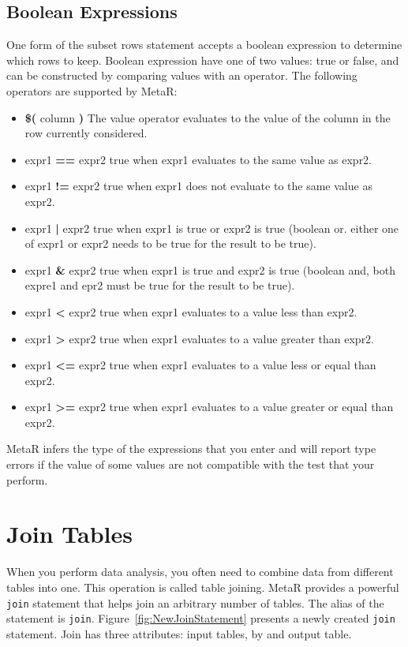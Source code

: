 \subsection{Boolean Expressions}
One form of the subset rows statement accepts a boolean expression to determine which rows to keep. Boolean expression have one of two values: true or false, and can be constructed by comparing values with an operator. The following operators are supported by MetaR:
\begin{itemize}
 \item \textbf{\$(} column \textbf{)} The value operator evaluates to the value of the column in the row currently considered.
	\item expr1 \textbf{==} expr2 true when expr1 evaluates to the same value as expr2.
	\item expr1 \textbf{!=} expr2 true when expr1 does not evaluate to the same value as expr2.
	\item expr1 \textbf{|} expr2 true when expr1 is true or expr2 is true (boolean or. either one of expr1 or expr2 needs to be true for the result to be true).
    \item expr1 \textbf{\&} expr2 true when expr1 is true and expr2 is true (boolean and, both expre1 and epr2 must be true for the result to be true).
    \item expr1 \textbf{<} expr2 true when expr1 evaluates to a value less than expr2.  
    \item expr1 \textbf{>} expr2 true when expr1 evaluates to a value greater than expr2.  
   \item expr1 \textbf{<=} expr2 true when expr1 evaluates to a value less or equal than expr2.  
    \item expr1 \textbf{>=} expr2 true when expr1 evaluates to a value greater or equal than expr2.  
\end{itemize}

\begin{remark}
MetaR infers the type of the expressions that you enter and will report type errors if the value of some values are not compatible with the test that your perform.
\end{remark}

\section{Join Tables}
When you perform data analysis, you often need to combine data from different tables into one. This operation is called table joining. MetaR provides a powerful \texttt{join} statement that helps join an arbitrary number of tables. The alias of the statement is \texttt{join}. Figure~\ref{fig:NewJoinStatement} presents a newly created \texttt{join} statement. Join has three attributes: input tables, by and output table.

